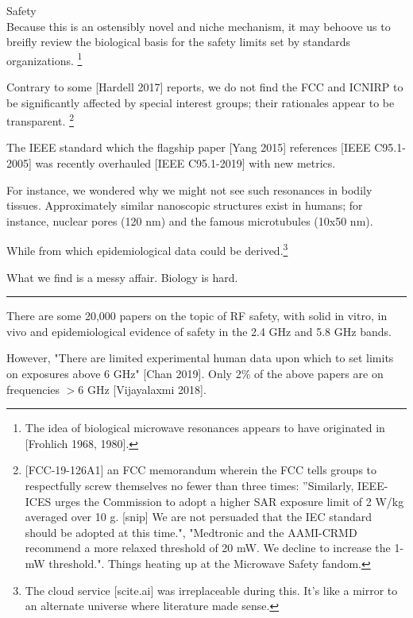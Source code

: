 \documentclass[fleqn,10pt]{article}
\begin{document}
\clearpage
\begin{multicols}{1}
{\Large Safety}\\



Because this is an ostensibly novel and niche mechanism, it may behoove us to breifly review the biological basis for the safety limits set by standards organizations. \footnote{The idea of biological microwave resonances appears to have originated in [Frohlich 1968, 1980].}

Contrary to some [Hardell 2017] reports, we do not find the FCC and ICNIRP to be significantly affected by special interest groups; their rationales appear to be transparent. 
\footnote{[FCC-19-126A1] an FCC memorandum wherein the FCC tells groups to respectfully screw themselves no fewer than three times: ''Similarly, IEEE-ICES urges the Commission to
adopt a higher SAR exposure limit of 2 W/kg averaged over 10 g. [snip] We are not persuaded that the IEC standard should be adopted at this time.", "Medtronic and the AAMI-CRMD recommend a more relaxed threshold of 20 mW. We decline to increase the 1-mW threshold.". Things heating up at the Microwave Safety fandom.}


The IEEE standard which the flagship paper [Yang 2015] references [IEEE C95.1-2005] was recently overhauled [IEEE C95.1-2019] with new metrics.

For instance, we wondered why we might not see such resonances in bodily tissues. Approximately similar nanoscopic structures exist in humans; for instance, nuclear pores (120 nm) and the famous microtubules (10x50 nm). 

While from which epidemiological data could be derived.\footnote{The cloud service [scite.ai] was irreplaceable during this. It's like a mirror to an alternate universe where literature made sense.}

What we find is a messy affair. Biology is hard.

\rule{\linewidth}{0.2pt}

There are some 20,000 papers on the topic of RF safety, with solid in vitro, in vivo and epidemiological evidence of safety in the 2.4 GHz and 5.8 GHz bands.

However, "There are limited experimental human data upon which to set limits on exposures above 6 GHz" [Chan 2019]. Only 2\% of the above papers are on frequencies $>6$ GHz [Vijayalaxmi 2018]. 


\end{multicols}
\end{document}
